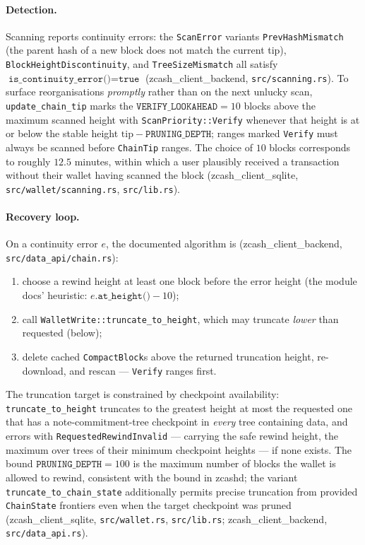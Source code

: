 \documentclass[11pt,a4paper]{article}
\theoremstyle{definition}
\begin{document}
\paragraph{Detection.} Scanning reports continuity errors: the
\texttt{ScanError} variants \texttt{PrevHashMismatch} (the parent hash of a
new block does not match the current tip), \texttt{BlockHeightDiscontinuity},
and \texttt{TreeSizeMismatch} all satisfy
$\texttt{is\_continuity\_error()} = \texttt{true}$
(\textsf{zcash\_client\_backend}, \texttt{src/scanning.rs}). To surface
reorganisations \emph{promptly} rather than on the next unlucky scan,
\texttt{update\_chain\_tip} marks the $\mathtt{VERIFY\_LOOKAHEAD} = 10$
blocks above the maximum scanned height with
\texttt{ScanPriority::Verify} whenever that height is at or below the
stable height $\mathrm{tip} - \mathtt{PRUNING\_DEPTH}$; ranges marked
\texttt{Verify} must always be scanned before \texttt{ChainTip} ranges.
The choice of $10$ blocks corresponds to roughly $12.5$ minutes, within
which a user plausibly received a transaction without their wallet having
scanned the block
(\textsf{zcash\_client\_sqlite}, \texttt{src/wallet/scanning.rs},
\texttt{src/lib.rs}).

\paragraph{Recovery loop.} On a continuity error $e$, the documented
algorithm is
(\textsf{zcash\_client\_backend}, \texttt{src/data\_api/chain.rs}):
\begin{enumerate}[leftmargin=*]
\item choose a rewind height at least one block before the error height
  (the module docs' heuristic: $e.\texttt{at\_height()} - 10$);
\item call \texttt{WalletWrite::truncate\_to\_height}, which may truncate
  \emph{lower} than requested (below);
\item delete cached \texttt{CompactBlock}s above the returned truncation
  height, re-download, and rescan --- \texttt{Verify} ranges first.
\end{enumerate}
The truncation target is constrained by checkpoint availability:
\texttt{truncate\_to\_height} truncates to the greatest height at most the
requested one that has a note-commitment-tree checkpoint in \emph{every}
tree containing data, and errors with \texttt{RequestedRewindInvalid} ---
carrying the safe rewind height, the maximum over trees of their minimum
checkpoint heights --- if none exists. The bound
$\mathtt{PRUNING\_DEPTH} = 100$ is the maximum number of blocks the wallet
is allowed to rewind, consistent with the bound in \textsf{zcashd}; the
variant \texttt{truncate\_to\_chain\_state} additionally permits precise
truncation from provided \texttt{ChainState} frontiers even when the
target checkpoint was pruned
(\textsf{zcash\_client\_sqlite}, \texttt{src/wallet.rs},
\texttt{src/lib.rs}; \textsf{zcash\_client\_backend},
\texttt{src/data\_api.rs}).
\end{document}
